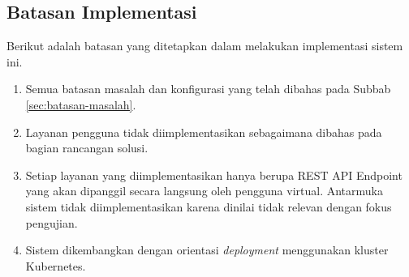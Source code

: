 \subsection{Batasan Implementasi}

Berikut adalah batasan yang ditetapkan dalam melakukan implementasi sistem ini.

\begin{enumerate}
  \item Semua batasan masalah dan konfigurasi yang telah dibahas pada Subbab \ref{sec:batasan-masalah}.
  \item Layanan pengguna tidak diimplementasikan sebagaimana dibahas pada bagian rancangan solusi.
  \item Setiap layanan yang diimplementasikan hanya berupa REST API Endpoint yang akan dipanggil secara langsung oleh pengguna virtual. Antarmuka sistem tidak diimplementasikan karena dinilai tidak relevan dengan fokus pengujian.
  \item Sistem dikembangkan dengan orientasi \textit{deployment} menggunakan kluster Kubernetes.
\end{enumerate}
